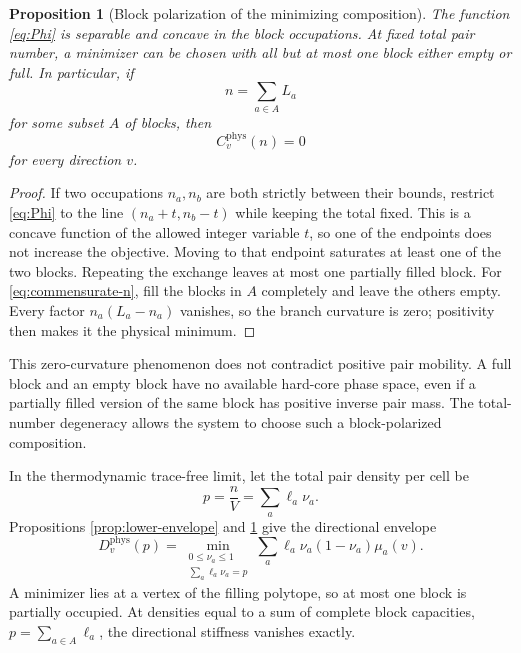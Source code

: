 \documentclass[11pt]{article}
\numberwithin{equation}{section}
\newtheorem{proposition}[theorem]{Proposition}
\begin{document}
\begin{proposition}[Block polarization of the minimizing composition]
\label{prop:block-polarization}
The function \eqref{eq:Phi} is separable and concave in the block occupations.  At fixed total pair number, a minimizer can be chosen with all but at most one block either empty or full.  In particular, if
\begin{equation}
 n=\sum_{a\in A}L_a
 \label{eq:commensurate-n}
\end{equation}
for some subset $A$ of blocks, then
\begin{equation}
 \boxed{C_v^{\mathrm{phys}}(n)=0}
 \label{eq:commensurate-zero}
\end{equation}
for every direction $v$.
\end{proposition}

\begin{proof}
If two occupations $n_a,n_b$ are both strictly between their bounds, restrict \eqref{eq:Phi} to the line $(n_a+t,n_b-t)$ while keeping the total fixed.  This is a concave function of the allowed integer variable $t$, so one of the endpoints does not increase the objective.  Moving to that endpoint saturates at least one of the two blocks.  Repeating the exchange leaves at most one partially filled block.  For \eqref{eq:commensurate-n}, fill the blocks in $A$ completely and leave the others empty.  Every factor $n_a(L_a-n_a)$ vanishes, so the branch curvature is zero; positivity then makes it the physical minimum.
\end{proof}

This zero-curvature phenomenon does not contradict positive pair mobility.  A full block and an empty block have no available hard-core phase space, even if a partially filled version of the same block has positive inverse pair mass.  The total-number degeneracy allows the system to choose such a block-polarized composition.

In the thermodynamic trace-free limit, let the total pair density per cell be
\begin{equation}
 p=\frac nV=\sum_a\ell_a\nu_a.
 \label{eq:p-density}
\end{equation}
Propositions \ref{prop:lower-envelope} and \ref{prop:block-polarization} give the directional envelope
\begin{equation}
 \boxed{
 D_v^{\mathrm{phys}}(p)
 =\min_{\substack{0\le\nu_a\le1\\
 \sum_a\ell_a\nu_a=p}}
 \sum_a\ell_a\nu_a(1-\nu_a)\mu_a(v).}
 \label{eq:thermo-envelope}
\end{equation}
A minimizer lies at a vertex of the filling polytope, so at most one block is partially occupied.  At densities equal to a sum of complete block capacities, $p=\sum_{a\in A}\ell_a$, the directional stiffness vanishes exactly.
\end{document}
